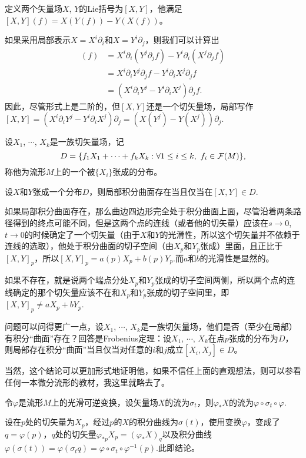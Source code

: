 \para 定义两个矢量场$X$, $Y$的Lie括号为$[X,Y]$，他满足$[X,Y](f)=X(Y(f))-Y(X(f))$。

如果采用局部表示$X=X^i\partial_i$和$X=Y^i\partial_j$，则我们可以计算出
	\begin{align*}
	[X,Y](f)&=X^i\partial_i(Y^j\partial_j f)-Y^i\partial_i(X^j\partial_j f)\\
	&=X^i\partial_iY^j\partial_j f-Y^i\partial_i X^j\partial_j f\\
	&=(X^i\partial_iY^j-Y^i\partial_i X^j)\partial_jf.
	\end{align*}
	因此，尽管形式上是二阶的，但$[X,Y]$还是一个切矢量场，局部写作$[X,Y]=(X^i\partial_iY^j-Y^i\partial_i X^j)\partial_j=(X(Y^j)-Y(X^j))\partial_j$.


\para 设$X_1$, $\cdots$, $X_k$是一族切矢量场，记
	\[
		D=\{f_1X_1+\cdots+f_kX_k:\forall 1\leq i \leq k,\,\, f_i\in \mathcal{F}(M)\},
	\]
	称他为流形$M$上的一个被$\{X_i\}$张成的分布。

\para 设$X$和$Y$张成一个分布$D$，则局部积分曲面存在当且仅当在$[X,Y]\in D$.

如果局部积分曲面存在，那么曲边四边形完全处于积分曲面上面，尽管沿着两条路径得到的终点可能不同，但是这两个点的连线（或者他的切矢量）应该在$s\to 0$, $t\to 0$的时候确定了一个切矢量（由于$X$和$Y$的光滑性，所以这个切矢量并不依赖于连线的选取），他处于积分曲面的切子空间（由$X_p$和$Y_p$张成）里面，且正比于$[X,Y]_p$，所以$[X,Y]_p=a(p)X_p+b(p)Y_p$.而$a$和$b$的光滑性是显然的。

如果不存在，就是说两个端点分处$X_p$和$Y_p$张成的切子空间两侧，所以两个点的连线确定的那个切矢量应该不在和$X_p$和$Y_p$张成的切子空间里，即$[X,Y]_p\neq aX_p+bY_p$.


\para 问题可以问得更广一点，设$X_1$, $\cdots$, $X_k$是一族切矢量场，他们是否（至少在局部）有积分“曲面”存在？回答是Frobenius定理：设$X_1$, $\cdots$, $X_k$在点$p$张成的分布为$D$，则局部存在积分“曲面”当且仅当对任意的$i$和$j$成立$[X_i,X_j]\in D$。

当然，这个结论可以更加形式地证明他，如果不信任上面的直观想法，则可以参看任何一本微分流形的教材，我这里就略去了。

\para 令$\varphi$是流形$M$上的光滑可逆变换，设矢量场$X$的流为$\sigma_t$，则$\varphi_*X$的流为$\varphi\circ \sigma_t\circ\varphi$.

设在$p$处的切矢量为$X_p$，经过$p$的$X$的积分曲线为$\sigma(t)$，使用变换$\varphi$，变成了$q=\varphi(p)$，$q$处的切矢量$\varphi_{*p}X_p=(\varphi_*X)_q$以及积分曲线$\varphi(\sigma(t))=\varphi(\sigma_t q)=\varphi\circ\sigma_t\circ \varphi^{-1}(p)$.此即结论。

